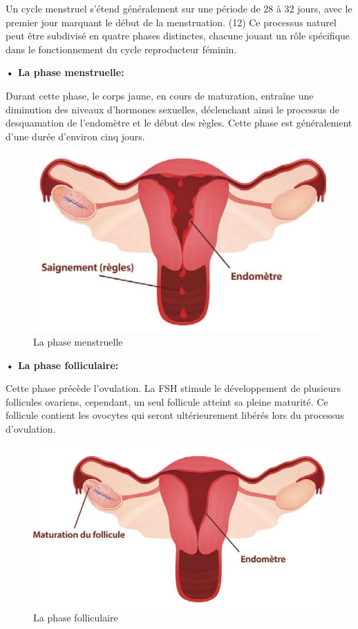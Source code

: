 Un cycle menstruel s'étend généralement sur une période de 28 à 32 jours, avec le premier jour marquant le début de la menstruation. (12) Ce processus naturel peut être subdivisé en quatre phases distinctes, chacune jouant un rôle spécifique dans le fonctionnement du cycle reproducteur féminin.


\hspace{1em}\textbf{•	La phase menstruelle:} \vspace{.5em}

\noindent Durant cette phase, le corps jaune, en cours de maturation, entraîne une diminution des niveaux d'hormones sexuelles, déclenchant ainsi le processus de desquamation de l'endomètre et le début des règles. Cette phase est généralement d'une durée d'environ cinq jours. 
  
\begin{figure}[H]
  \centering
  \includegraphics{Images/fig_4.jpg}
  \caption{La phase menstruelle }
\end{figure}


\hspace{1em}\textbf{•	La phase folliculaire: } \vspace{.5em}

\noindent Cette phase précède l’ovulation. La FSH stimule le développement de plusieurs follicules ovariens, cependant, un seul follicule atteint sa pleine maturité. Ce follicule contient les ovocytes qui seront ultérieurement libérés lors du processus d’ovulation.

\begin{figure}[H]
  \centering
  \includegraphics{Images/fig_5}
  \caption{La phase folliculaire }
\end{figure}


